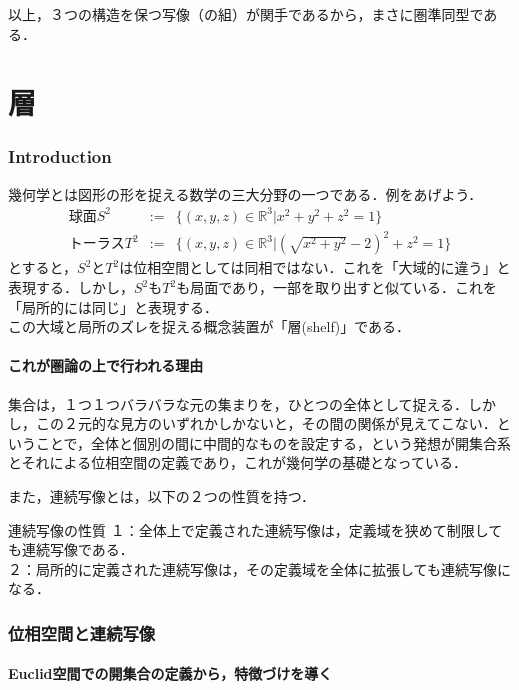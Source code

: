 \documentclass[uplatex, 12pt, a4paper, dvipdfmx]{jsarticle}
\begin{document}
以上，３つの構造を保つ写像（の組）が関手であるから，まさに圏準同型である．

\part{層}

\section{Introduction}

幾何学とは図形の形を捉える数学の三大分野の一つである．例をあげよう．
\begin{eqnarray*}球面S^2 &:=& \{ (x,y,z) \in \mathbb{R}^3 | x^2+y^2+z^2 = 1 \} \\ トーラスT^2 &:=& \{ (x,y,z)\in\mathbb{R}^3 | (\sqrt{x^2+y^2}-2)^2 + z^2 = 1 \}\end{eqnarray*}
とすると，$S^2$と$T^2$は位相空間としては同相ではない．これを「大域的に違う」と表現する．しかし，$S^2$も$T^2$も局面であり，一部を取り出すと似ている．これを「局所的には同じ」と表現する．\\
この大域と局所のズレを捉える概念装置が「層(shelf)」である．

\subsection{これが圏論の上で行われる理由}

集合は，１つ１つバラバラな元の集まりを，ひとつの全体として捉える．しかし，この２元的な見方のいずれかしかないと，その間の関係が見えてこない．ということで，全体と個別の間に中間的なものを設定する，という発想が開集合系とそれによる位相空間の定義であり，これが幾何学の基礎となっている．\par

また，連続写像とは，以下の２つの性質を持つ．
\begin{itembox}[l]{連続写像の性質}
    １：全体上で定義された連続写像は，定義域を狭めて制限しても連続写像である．\\
    ２：局所的に定義された連続写像は，その定義域を全体に拡張しても連続写像になる．
\end{itembox}

\section{位相空間と連続写像}

\subsection{Euclid空間での開集合の定義から，特徴づけを導く}
\end{document}
